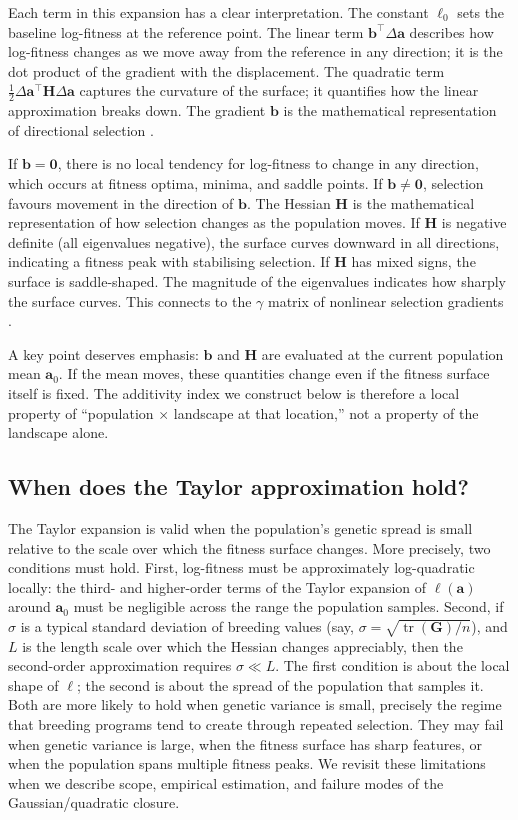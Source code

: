 \documentclass[9pt,twocolumn,twoside,lineno]{gsajnl}
\newcommand{\vect}[1]{\boldsymbol{#1}}
\newcommand{\mat}[1]{\mathbf{#1}}
\newcommand{\tr}{\ensuremath{\operatorname{tr}}\xspace}
\begin{document}
Each term in this expansion has a clear interpretation. The constant $\ell_0$ sets the baseline log-fitness at the reference point. The linear term $\vect{b}^\top \Delta\vect{a}$ describes how log-fitness changes as we move away from the reference in any direction; it is the dot product of the gradient with the displacement. The quadratic term $\tfrac{1}{2}\Delta\vect{a}^\top \mat{H} \Delta\vect{a}$ captures the curvature of the surface; it quantifies how the linear approximation breaks down. The gradient $\vect{b}$ is the mathematical representation of directional selection \citep{LandeArnold1983}. 

If $\vect{b} = \vect{0}$, there is no local tendency for log-fitness to change in any direction, which occurs at fitness optima, minima, and saddle points. If $\vect{b} \neq \vect{0}$, selection favours movement in the direction of $\vect{b}$. The Hessian $\mat{H}$ is the mathematical representation of how selection changes as the population moves. If $\mat{H}$ is negative definite (all eigenvalues negative), the surface curves downward in all directions, indicating a fitness peak with stabilising selection. If $\mat{H}$ has mixed signs, the surface is saddle-shaped. The magnitude of the eigenvalues indicates how sharply the surface curves. This connects to the $\gamma$ matrix of nonlinear selection gradients \citep{LandeArnold1983, PhillipsArnold1989}.

A key point deserves emphasis: $\vect{b}$ and $\mat{H}$ are evaluated at the current population mean $\vect{a}_0$. If the mean moves, these quantities change even if the fitness surface itself is fixed. The additivity index we construct below is therefore a local property of ``population $\times$ landscape at that location,'' not a property of the landscape alone.

\subsection{When does the Taylor approximation hold?}

The Taylor expansion is valid when the population's genetic spread is small relative to the scale over which the fitness surface changes. More precisely, two conditions must hold. First, log-fitness must be approximately log-quadratic locally: the third- and higher-order terms of the Taylor expansion of $\ell(\vect{a})$ around $\vect{a}_0$ must be negligible across the range the population samples. Second, if $\sigma$ is a typical standard deviation of breeding values (say, $\sigma = \sqrt{\tr(\mat{G})/n}$), and $L$ is the length scale over which the Hessian changes appreciably, then the second-order approximation requires $\sigma \ll L$. The first condition is about the local shape of $\ell$; the second is about the spread of the population that samples it. Both are more likely to hold when genetic variance is small, precisely the regime that breeding programs tend to create through repeated selection. They may fail when genetic variance is large, when the fitness surface has sharp features, or when the population spans multiple fitness peaks. We revisit these limitations when we describe scope, empirical estimation, and failure modes of the Gaussian/quadratic closure.
\end{document}
